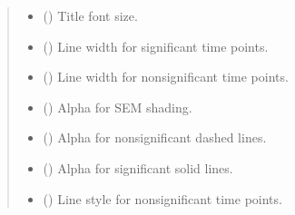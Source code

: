 \documentclass[letterpaper,10pt,english]{sphinxhowto}
\begin{document}
\begin{fulllineitems}
\begin{quote}
\begin{description}
\begin{itemize}
\item {} 
\sphinxAtStartPar
{} (\sphinxstyleliteralemphasis{\sphinxupquote{, }}) \textendash{} Title font size.

\item {} 
\sphinxAtStartPar
{} (\sphinxstyleliteralemphasis{\sphinxupquote{, }}) \textendash{} Line width for significant time points.

\item {} 
\sphinxAtStartPar
{} (\sphinxstyleliteralemphasis{\sphinxupquote{, }}) \textendash{} Line width for non\sphinxhyphen{}significant time points.

\item {} 
\sphinxAtStartPar
{} (\sphinxstyleliteralemphasis{\sphinxupquote{, }}) \textendash{} Alpha for SEM shading.

\item {} 
\sphinxAtStartPar
{} (\sphinxstyleliteralemphasis{\sphinxupquote{, }}) \textendash{} Alpha for non\sphinxhyphen{}significant dashed lines.

\item {} 
\sphinxAtStartPar
{} (\sphinxstyleliteralemphasis{\sphinxupquote{, }}) \textendash{} Alpha for significant solid lines.

\item {} 
\sphinxAtStartPar
{} (\sphinxstyleliteralemphasis{\sphinxupquote{, }}) \textendash{} Line style for non\sphinxhyphen{}significant time points.


\end{itemize}
\end{description}
\end{quote}
\end{fulllineitems}
\end{document}
